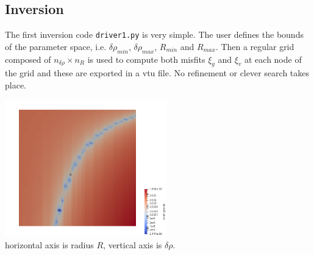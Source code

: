\subsection*{Inversion}

The first inversion code {\tt driver1.py} is very simple. The user defines the bounds of the 
parameter space, i.e. $\delta\rho_{min}$, $\delta\rho_{max}$, $R_{min}$ and $R_{max}$.
Then a regular grid composed of $n_{\delta\rho} \times n_{R}$ is used to compute 
both misfits $\xi_g$ and $\xi_v$ at each node of the grid and these are 
exported in a vtu file. No refinement or clever search takes place. 


\begin{center}
\includegraphics[width=7cm]{python_codes/fieldstone_114/results/mg}\\
{\captionfont horizontal axis is radius $R$, vertical axis is $\delta\rho$. } 
\end{center}







